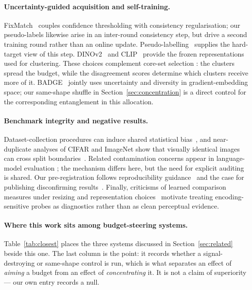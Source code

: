 \documentclass{article} %
\begin{document}
\paragraph{Uncertainty-guided acquisition and self-training.}
FixMatch~\cite{sohn2020fixmatch} couples confidence thresholding with consistency regularisation;
our pseudo-labels likewise arise in an inter-round consistency step, but drive a second training
round rather than an online update. Pseudo-labelling~\cite{lee2013pseudo} supplies the hard-target
view of this step. DINOv2~\cite{oquab2024dinov2} and CLIP~\cite{radford2021learning} provide the
frozen representations used for clustering. These choices complement core-set selection
\cite{sener2018active}: the clusters spread the budget, while the disagreement scores determine
which clusters receive more of it. BADGE~\cite{ash2020deep} jointly uses uncertainty and diversity
in gradient-embedding space; our same-shape shuffle in Section~\ref{sec:concentration} is a direct
control for the corresponding entanglement in this allocation.

\paragraph{Benchmark integrity and negative results.}
Dataset-collection procedures can induce shared statistical bias~\cite{torralba2011unbiased}, and
near-duplicate analyses of CIFAR and ImageNet show that visually identical images can cross split
boundaries~\cite{barz2020train}. Related contamination concerns appear in language-model evaluation
\cite{wu2024antileak}; the mechanism differs here, but the need for explicit auditing is shared.
Our pre-registration follows reproducibility guidance~\cite{pineau2021improving} and the case for
publishing disconfirming results~\cite{karl2024position}. Finally, criticisms of learned comparison
measures under resizing and representation choices~\cite{parmar2022aliased,jayasumana2024rethinking}
motivate treating encoding-sensitive probes as diagnostics rather than as clean perceptual evidence.

\paragraph{Where this work sits among budget-steering systems.} Table~\ref{tab:closest} places the
three systems discussed in Section~\ref{sec:related} beside this one. The last column is the point:
it records whether a signal-destroying or same-shape control is run, which is what separates an
effect of \emph{aiming} a budget from an effect of \emph{concentrating} it. It is not a claim of
superiority --- our own entry records a null.
\end{document}
